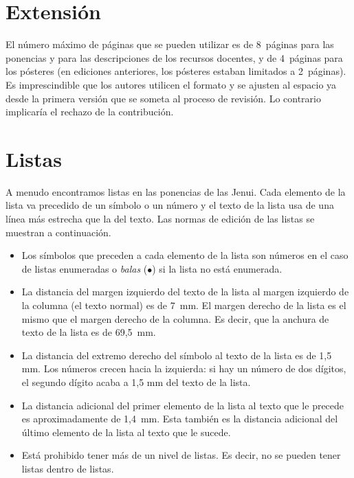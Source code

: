 \documentclass[twocolumn,twoside,a4paper, 10pt]{article}
\begin{document}
\section{Extensión}

El número máximo de páginas que se pueden utilizar es de 8~páginas para las ponencias 
y para las descripciones de los recursos docentes, y de 4~páginas para los pósteres 
(en ediciones anteriores, los pósteres estaban limitados a 2~páginas). 
Es imprescindible que los autores utilicen el formato y se ajusten al espacio ya 
desde la primera versión que se someta al proceso de revisión. Lo contrario implicaría 
el rechazo de la contribución.

\section{Listas}

A menudo encontramos listas en las ponencias de las Jenui. 
Cada elemento de la lista va precedido de un símbolo o un número y 
el texto de la lista usa de una línea más estrecha que la del texto. 
Las normas de edición de las listas se muestran a continuación.

\begin{itemize}
	\item Los símbolos que preceden a cada elemento de la lista son 
	números en el caso de listas enumeradas o \emph{balas} 
	($\bullet$) si la lista no está enumerada.
	
	\item La distancia del margen izquierdo del texto de la lista al
	margen izquierdo de la columna (el texto normal) es de 7~mm.  El
	margen derecho de la lista es el mismo que el margen derecho de la
	columna. Es decir, que la anchura de texto de la lista es de 69,5~mm.
	
	\item La distancia del extremo derecho del símbolo al texto de la 
	lista es de 1,5 mm. Los números crecen hacia la izquierda: si hay 
	un número de dos dígitos, el segundo dígito acaba a 1,5 mm del 
	texto de la lista.
	
	\item La distancia adicional del primer elemento de la lista al texto que 
	le precede es aproximadamente de 1,4~mm. Esta también es la distancia adicional del último 
	elemento de la lista al texto que le sucede.
	
	\item Está prohibido tener más de un nivel de 
	listas. Es decir, no se pueden tener listas dentro de listas.
\end{itemize}
\end{document}
